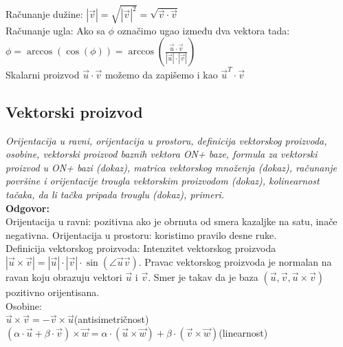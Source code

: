 \documentclass[12pt]{article}
\begin{document}
    Računanje dužine: $|\overrightarrow{v}|=\sqrt{|\overrightarrow{v}|^2}=\sqrt{\overrightarrow{v}\cdot\overrightarrow{v}}$\\
    Računanje ugla: Ako sa $\phi$ označimo ugao između dva vektora tada:\\
$\phi=\arccos(\cos(\phi))=\arccos(\frac{\overrightarrow{u}\cdot\overrightarrow{v}}{|\overrightarrow{u}|\cdot|\overrightarrow{v}|})$\\
    Skalarni proizvod $\overrightarrow{u}\cdot\overrightarrow{v}$ možemo da zapišemo i kao $\overrightarrow{u}^T\cdot\overrightarrow{v}$
    \par
    \subsection{Vektorski proizvod}
    \textit{Orijentacija u ravni, orijentacija u prostoru, definicija vektorskog proizvoda, osobine,
        vektorski proizvod baznih vektora ON+ baze, formula za vektorski
        proizvod u ON+ bazi (dokaz), matrica vektorskog množenja (dokaz),
        računanje površine i orijentacije trougla vektorskim proizvodom
        (dokaz), kolinearnost tačaka, da li tačka pripada trouglu (dokaz),
        primeri.
    }\\
    \textbf{Odgovor:}\\
    Orijentacija u ravni: pozitivna ako je obrnuta od smera kazaljke na satu, inače negativna.
    Orijentacija u prostoru: koristimo pravilo desne ruke.\\
    Definicija vektorskog proizvoda: Intenzitet vektorskog proizvoda $|\overrightarrow{u}\times\overrightarrow{v}|=|\overrightarrow{u}|\cdot|\overrightarrow{v}|\cdot\sin(\angle
\overrightarrow{u}\overrightarrow{v})$. Pravac vektorskog proizvoda je normalan na ravan koju obrazuju vektori $\overrightarrow{u}$ i $\overrightarrow{v}$. Smer je takav
    da je baza $(\overrightarrow{u}, \overrightarrow{v}, \overrightarrow{u}\times\overrightarrow{v})$ pozitivno orijentisana.\\
    Osobine:\\
$\overrightarrow{u}\times\overrightarrow{v}=-\overrightarrow{v}\times\overrightarrow{u}$\hspace*{1cm}(antisimetričnost)\\
$(\alpha\cdot\overrightarrow{u}+\beta\cdot\overrightarrow{v})\times\overrightarrow{w}=\alpha\cdot(\overrightarrow{u}\times\overrightarrow{w})+\beta\cdot(\overrightarrow{v}\times\overrightarrow{w})$\hspace*{1cm}(linearnost)
    \\[0.5cm]
\end{document}
